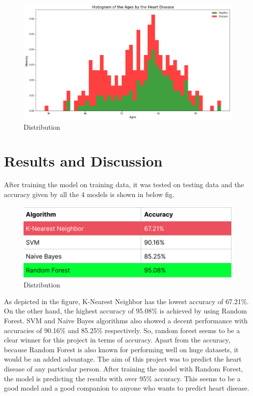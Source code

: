 \documentclass{article}
\begin{document}
\begin{figure}[h]
    \centering
    \includegraphics[scale=0.30]{__results___9_0.png}
    \caption{Distribution}
\end{figure}


\section{Results and Discussion}

After training the model on training data, it was tested on testing data and the accuracy given by all the 4 models is shown in below fig.
\begin{figure}[h]
    \centering
    \includegraphics[scale=0.30]{Screenshot from 2021-12-12 10-45-18.png}
    \caption{Distribution}
\end{figure}

As depicted in the figure, K-Nearest Neighbor has the lowest accuracy of 67.21\%. On the other hand, the highest accuracy of 95.08\% is achieved by using Random Forest. SVM and Naive Bayes algorithms also showed a decent performance with accuracies of 90.16\% and 85.25\% respectively. So, random forest seems to be a clear winner for this project in terms of accuracy. Apart from the accuracy, because Random Forest is also known for performing well on huge datasets, it would be an added advantage.
The aim of this project was to predict the heart disease of any particular person. After training the model with Random Forest, the model is predicting the results with over 95\% accuracy. This seems to be a good model and a good companion to anyone who wants to predict heart disease.
\end{document}
